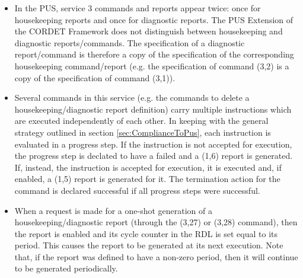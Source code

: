 \documentclass{pnp_article}
\begin{document}
\begin{itemize}
\item In the PUS, service 3 commands and reports appear twice: once for housekeeping reports and once for diagnostic reports. The PUS Extension of the CORDET Framework does not distinguish between housekeeping and diagnostic reports/commands. The specification of a diagnostic report/command is therefore a copy of the specification of the corresponding housekeeping command/report (e.g. the specification of command (3,2) is a copy of the specification of command (3,1)).
\item Several commands in this service (e.g. the commands to delete a housekeeping/diagnostic report definition) carry multiple instructions which are executed independently of each other. In keeping with the general strategy outlined in section \ref{sec:ComplianceToPus}, each instruction is evaluated in a progress step. If the instruction is not accepted for execution, the progress step is declated to have a failed and a (1,6) report is generated. If, instead, the instruction is accepted for execution, it is executed and, if enabled, a (1,5) report is generated for it. The termination action for the command is declared successful if all progress steps were successful. 
\item When a request is made for a one-shot generation of a housekeeping/diagnostic report (through the (3,27) or (3,28) command), then the report is enabled and its cycle counter in the RDL is set equal to its period. This causes the report to be generated at its next execution. Note that, if the report was defined to have a non-zero period, then it will continue to be generated periodically.
\end{itemize}

\newpage
{}
\newpage
{}
\newpage
{}
\newpage
{}
\newpage
{}
\newpage
{}
\newpage
{}
\newpage
{}
\newpage
{}
\newpage
{}
\newpage
{}
\newpage
{}
\newpage
{}
\newpage
{}
\newpage
{}
\newpage
{}
\newpage
{}
\newpage
{}
\end{document}
